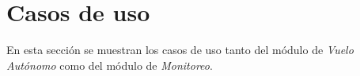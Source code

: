 %

\section{Casos de uso}
En esta sección se muestran los casos de uso tanto del módulo de \textit{Vuelo Autónomo} como del módulo de \textit{Monitoreo}.




